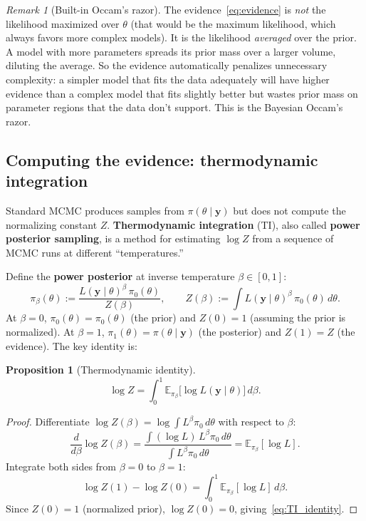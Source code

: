 \documentclass[11pt]{article}
\newcommand{\E}{\mathbb{E}}
\theoremstyle{plain}
\newtheorem{proposition}{Proposition}
\theoremstyle{remark}
\newtheorem{remark}{Remark}
\theoremstyle{definition}
\begin{document}
\begin{remark}[Built-in Occam's razor]
The evidence~\eqref{eq:evidence} is \emph{not} the likelihood maximized over 
$\theta$ (that would be the maximum likelihood, which always favors more 
complex models). It is the likelihood \emph{averaged} over the prior. A model 
with more parameters spreads its prior mass over a larger volume, diluting 
the average. So the evidence automatically penalizes unnecessary complexity: 
a simpler model that fits the data adequately will have higher evidence than 
a complex model that fits slightly better but wastes prior mass on 
parameter regions that the data don't support. This is the Bayesian Occam's 
razor.
\end{remark}

\subsection{Computing the evidence: thermodynamic integration}
\label{sec:TI}

Standard MCMC produces samples from $\pi(\theta \mid \mathbf{y})$ but does 
not compute the normalizing constant $Z$. \textbf{Thermodynamic integration} 
(TI), also called \textbf{power posterior sampling}, is a method for estimating 
$\log Z$ from a sequence of MCMC runs at different ``temperatures.''

Define the \textbf{power posterior} at inverse temperature $\beta \in [0, 1]$:
\begin{equation}\label{eq:power_posterior}
\pi_\beta(\theta) := \frac{L(\mathbf{y} \mid \theta)^\beta\,\pi_0(\theta)}{Z(\beta)},
\qquad Z(\beta) := \int L(\mathbf{y} \mid \theta)^\beta\,\pi_0(\theta)\,d\theta.
\end{equation}
At $\beta = 0$, $\pi_0(\theta) = \pi_0(\theta)$ (the prior) and $Z(0) = 1$ 
(assuming the prior is normalized). At $\beta = 1$, 
$\pi_1(\theta) = \pi(\theta \mid \mathbf{y})$ (the posterior) and $Z(1) = Z$ 
(the evidence). The key identity is:

\begin{proposition}[Thermodynamic identity]
\begin{equation}\label{eq:TI_identity}
\log Z = \int_0^1 \E_{\pi_\beta}\bigl[\log L(\mathbf{y} \mid \theta)\bigr]\,d\beta.
\end{equation}
\end{proposition}

\begin{proof}
Differentiate $\log Z(\beta) = \log \int L^\beta \pi_0\,d\theta$ with respect 
to $\beta$:
\[
\frac{d}{d\beta}\log Z(\beta) 
= \frac{\int (\log L)\,L^\beta \pi_0\,d\theta}{\int L^\beta \pi_0\,d\theta}
= \E_{\pi_\beta}[\log L].
\]
Integrate both sides from $\beta = 0$ to $\beta = 1$:
\[
\log Z(1) - \log Z(0) = \int_0^1 \E_{\pi_\beta}[\log L]\,d\beta.
\]
Since $Z(0) = 1$ (normalized prior), $\log Z(0) = 0$, giving~\eqref{eq:TI_identity}.
\end{proof}
\end{document}
